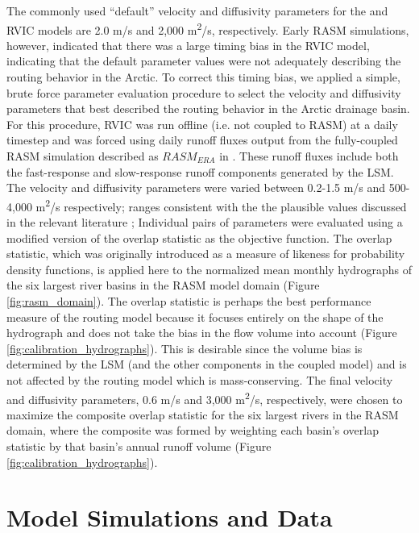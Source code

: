 \documentclass[jgrga, draft]{agutex}
\begin{document}
\begin{article}
The commonly used ``default'' velocity and diffusivity parameters for the \citet{Lohmann_1996} and RVIC models are 2.0 m/s and 2,000 m\textsuperscript{2}/s, respectively.
Early RASM simulations, however, indicated that there was a large timing bias in the RVIC model, indicating that the default parameter values were not adequately describing the routing behavior in the Arctic.
To correct this timing bias, we applied a simple, brute force parameter evaluation procedure to select the velocity and diffusivity parameters that best described the routing behavior in the Arctic drainage basin.
For this procedure, RVIC was run offline (i.e. not coupled to RASM) at a daily timestep and was forced using daily runoff fluxes output from the fully-coupled RASM simulation described as $RASM_{ERA}$ in \citet{Hamman_2016}.
These runoff fluxes include both the fast-response and slow-response runoff components generated by the LSM.
The velocity and diffusivity parameters were varied between 0.2-1.5 m/s and 500-4,000 m\textsuperscript{2}/s respectively; ranges consistent with the the plausible values discussed in the relevant literature \citep[e.g.][]{Decharme_2010,Lohmann_1996};
Individual pairs of parameters were evaluated using a modified version of the overlap statistic \citep{Perkins_2007} as the objective function.
The overlap statistic, which was originally introduced as a measure of likeness for probability density functions, is applied here to the normalized mean monthly hydrographs of the six largest river basins in the RASM model domain (Figure \ref{fig:rasm_domain}).
The overlap statistic is perhaps the best performance measure of the routing model because it focuses entirely on the shape of the hydrograph and does not take the bias in the flow volume into account (Figure \ref{fig:calibration_hydrographs}).
This is desirable since the volume bias is determined by the LSM (and the other components in the coupled model) and is not affected by the routing model which is mass-conserving.
The final velocity and diffusivity parameters, 0.6 m/s and 3,000 m\textsuperscript{2}/s, respectively, were chosen to maximize the composite overlap statistic for the six largest rivers in the RASM domain, where the composite was formed by weighting each basin's overlap statistic by that basin's annual runoff volume (Figure \ref{fig:calibration_hydrographs}).

\section{Model Simulations and Data}
\label{sec:data}


\end{article}
\end{document}
